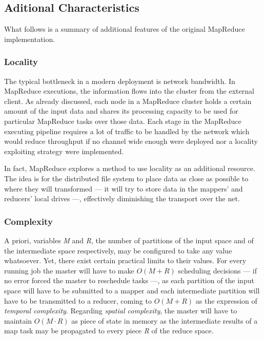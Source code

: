 \subsection{Aditional Characteristics}\label{subsec:caracteristicasadicionales}
\noindent What follows is a summary of additional features of the original MapReduce implementation.

\subsubsection{Locality}\label{subsubsec:localidad}

\noindent The typical bottleneck in a modern deployment is network bandwidth. In MapReduce executions, the information flows into the cluster from the external client. As already discussed, each node in a MapReduce cluster holds a certain amount of the input data and shares its processing capacity to be used for particular MapReduce tasks over those data. Each stage in the MapReduce executing pipeline requires a lot of traffic to be handled by the network which would reduce throughput if no channel wide enough were deployed nor a locality exploiting strategy were implemented.

In fact, MapReduce explores a method to use locality as an additional resource. The idea is for the distributed file system to place data as close as possible to where they will transformed --- it will try to store data in the mappers' and reducers' local drives ---, effectively diminishing the transport over the net.

\subsubsection{Complexity}\label{subsubsec:complejidad}
\noindent A priori, variables \emph{M} and \emph{R}, the number of partitions of the input space and of the intermediate space respectively, may be configured to take any value whatsoever. Yet, there exist certain practical limits to their values. For every running job the master will have to make $O(M + R)$ scheduling decisions --- if no error forced the master to reschedule tasks ---, as each partition of the input space will have to be submitted to a mapper and each intermediate partition will have to be transmitted to a reducer, coming to $O(M + R)$ as the expression of \emph{temporal complexity}. Regarding \emph{spatial complexity}, the master will have to maintain $O(M \cdot R)$ as piece of state in memory as the intermediate results of a map task may be propagated to every piece \emph{R} of the reduce space.


